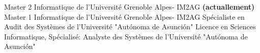 %
%
%


\begin{scholarship}
					{Master 2 Informatique 
 de l'Université Grenoble Alpes- IM2AG \textbf{(actuallement)}}
					{Master 1 Informatique 
 de l'Université Grenoble Alpes- IM2AG }
					{Spécialiste en Audit des Systèmes de l'Université "Autónoma de Asunción"}
					{Licence en Sciences Informatique, Spécialisé: Analyste des Systèmes de l'Université "Autónoma de Asunción"}
\end{scholarship}